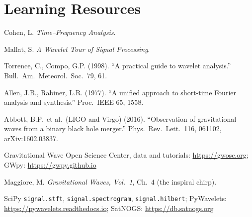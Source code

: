 \documentclass[11pt,a4paper]{article}
\begin{document}
\section*{Learning Resources}
\begin{resources}
  \item Cohen, L. \emph{Time--Frequency Analysis}.
  \item Mallat, S. \emph{A Wavelet Tour of Signal Processing}.
  \item Torrence, C., Compo, G.P. (1998). ``A practical guide to wavelet analysis.'' Bull.\ Am.\ Meteorol.\ Soc.\ 79, 61.
  \item Allen, J.B., Rabiner, L.R. (1977). ``A unified approach to short-time Fourier analysis and synthesis.'' Proc.\ IEEE 65, 1558.
\end{resources}
\begin{resources}
  \item Abbott, B.P.\ et al.\ (LIGO and Virgo) (2016). ``Observation of gravitational waves from a binary black hole merger.'' Phys.\ Rev.\ Lett.\ 116, 061102, arXiv:1602.03837.
  \item Gravitational Wave Open Science Center, data and tutorials: \url{https://gwosc.org}; GWpy: \url{https://gwpy.github.io}
  \item Maggiore, M. \emph{Gravitational Waves, Vol.~1}, Ch.~4 (the inspiral chirp).
\end{resources}
\begin{resources}
  \item SciPy \texttt{signal.stft}, \texttt{signal.spectrogram}, \texttt{signal.hilbert}; PyWavelets: \url{https://pywavelets.readthedocs.io}; SatNOGS: \url{https://db.satnogs.org}
\end{resources}

\evaluation
\end{document}
